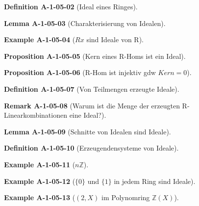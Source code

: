 \documentclass[10pt, letterpaper]{article}
\newcommand{\Z}{\mathbb{Z}}
\newcommand{\CustomHeading}[3]{%
  \par\medskip\noindent%
  \textbf{#1 #2} \textnormal{(#3)}.\enskip%
}
\newenvironment{DEF}[2]{\CustomHeading{Definition}{#1}{#2}}{}
\newenvironment{PROP}[2]{\CustomHeading{Proposition}{#1}{#2}}{}
\newenvironment{LEM}[2]{\CustomHeading{Lemma}{#1}{#2}}{}
\newenvironment{REM}[2]{\CustomHeading{Remark}{#1}{#2}}{}
\newenvironment{EXA}[2]{\CustomHeading{Example}{#1}{#2}}{}
\begin{document}
\begin{DEF}{A-1-05-02}{Ideal eines Ringes}
\end{DEF}

\begin{LEM}{A-1-05-03}{Charakterisierung von Idealen}
\end{LEM}

\begin{EXA}{A-1-05-04}{$Rx$ sind Ideale von R}
\end{EXA}

\begin{PROP}{A-1-05-05}{Kern eines R-Homs ist ein Ideal}
\end{PROP}

\begin{PROP}{A-1-05-06}{R-Hom ist injektiv gdw $Kern = 0$}
\end{PROP}

\begin{DEF}{A-1-05-07}{Von Teilmengen erzeugte Ideale}
\end{DEF}

\begin{REM}{A-1-05-08}{Warum ist die Menge der erzeugten R-Linearkombinationen eine Ideal?}
\end{REM}

\begin{LEM}{A-1-05-09}{Schnitte von Idealen sind Ideale}
\end{LEM}

\begin{DEF}{A-1-05-10}{Erzeugendensysteme von Ideale}
\end{DEF}

\begin{EXA}{A-1-05-11}{$n\Z$}
\end{EXA}

\begin{EXA}{A-1-05-12}{$\{0\}$ und $\{1\}$ in jedem Ring sind Ideale}
\end{EXA}

\begin{EXA}{A-1-05-13}{$(2,X)$ im Polynomring $\Z(X)$}
\end{EXA}
\end{document}
